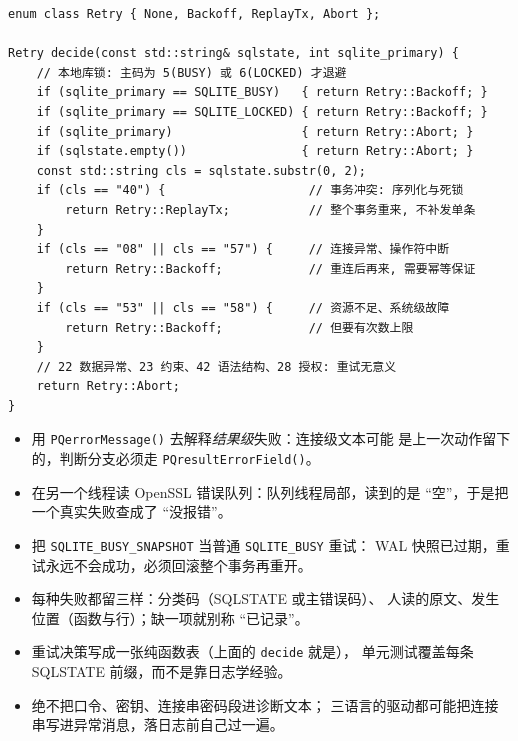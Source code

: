 \documentclass[12pt,a4paper,fontset=fandol]{ctexbook}
\newcommand{\Fn}[1]{\texttt{#1()}}
\newcommand{\Tp}[1]{\texttt{#1}}
\begin{document}
\begin{lstlisting}[caption={C/C++：按 SQLSTATE 前缀决定是否重试（整事务为单位）}]
enum class Retry { None, Backoff, ReplayTx, Abort };

Retry decide(const std::string& sqlstate, int sqlite_primary) {
    // 本地库锁: 主码为 5(BUSY) 或 6(LOCKED) 才退避
    if (sqlite_primary == SQLITE_BUSY)   { return Retry::Backoff; }
    if (sqlite_primary == SQLITE_LOCKED) { return Retry::Backoff; }
    if (sqlite_primary)                  { return Retry::Abort; }
    if (sqlstate.empty())                { return Retry::Abort; }
    const std::string cls = sqlstate.substr(0, 2);
    if (cls == "40") {                    // 事务冲突: 序列化与死锁
        return Retry::ReplayTx;           // 整个事务重来, 不补发单条
    }
    if (cls == "08" || cls == "57") {     // 连接异常、操作符中断
        return Retry::Backoff;            // 重连后再来, 需要幂等保证
    }
    if (cls == "53" || cls == "58") {     // 资源不足、系统级故障
        return Retry::Backoff;            // 但要有次数上限
    }
    // 22 数据异常、23 约束、42 语法结构、28 授权: 重试无意义
    return Retry::Abort;
}
\end{lstlisting}

\begin{warning}[title=三个 ``取错地方'' 的典型误诊]
\begin{itemize}
  \item 用 \Fn{PQerrorMessage} 去解释\emph{结果级}失败：连接级文本可能
        是上一次动作留下的，判断分支必须走 \Fn{PQresultErrorField}。
  \item 在另一个线程读 OpenSSL 错误队列：队列线程局部，读到的是
        ``空''，于是把一个真实失败查成了 ``没报错''。
  \item 把 \Tp{SQLITE\_BUSY\_SNAPSHOT} 当普通 \Tp{SQLITE\_BUSY} 重试：
        WAL 快照已过期，重试永远不会成功，必须回滚整个事务再重开。
\end{itemize}
\end{warning}

\begin{bestpractice}[title=将诊断变成一行可贴进工单的东西]
\begin{itemize}
  \item 每种失败都留三样：分类码（SQLSTATE 或主错误码）、
        人读的原文、发生位置（函数与行）；缺一项就别称 ``已记录''。
  \item 重试决策写成一张纯函数表（上面的 \Tp{decide} 就是），
        单元测试覆盖每条 SQLSTATE 前缀，而不是靠日志学经验。
  \item 绝不把口令、密钥、连接串密码段进诊断文本；
        三语言的驱动都可能把连接串写进异常消息，落日志前自己过一遍。
\end{itemize}
\end{bestpractice}
\end{document}
